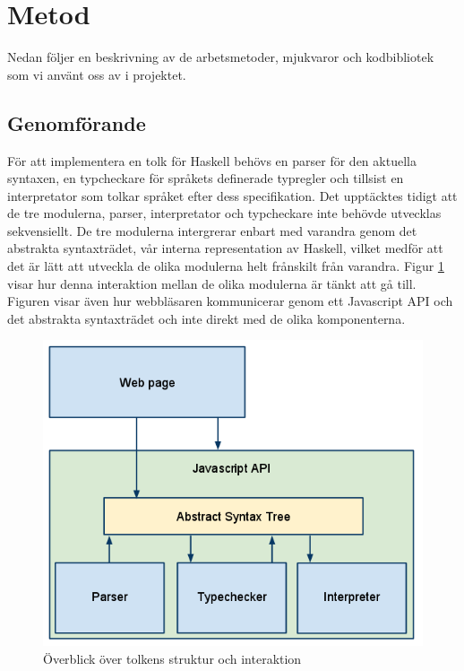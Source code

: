 \section{Metod} 

Nedan följer en beskrivning av de arbetsmetoder, mjukvaror och kodbibliotek som vi använt oss av i projektet. 

\subsection{Genomförande}

För att implementera en tolk för Haskell behövs en parser för den aktuella syntaxen, en typcheckare för språkets definerade typregler och tillsist en interpretator som tolkar språket efter dess specifikation.
Det upptäcktes tidigt att de tre modulerna, parser, interpretator och typcheckare inte behövde utvecklas sekvensiellt. De tre modulerna intergrerar enbart med varandra genom det abstrakta syntaxträdet, vår interna representation av Haskell, vilket medför att det är lätt att utveckla de olika modulerna helt frånskilt från varandra. Figur \ref{fig:tolkens_struktur} visar hur denna interaktion mellan de olika modulerna är tänkt att gå till. Figuren visar även hur webbläsaren kommunicerar genom ett Javascript API och det abstrakta syntaxträdet och inte direkt med de olika komponenterna. 

\begin{figure}[h]
    \begin{center}
        \includegraphics[width=1.0\textwidth]{image1.png}
        \caption{Överblick över tolkens struktur och interaktion}
        \label{fig:tolkens_struktur} %
    \end{center}
\end{figure}

